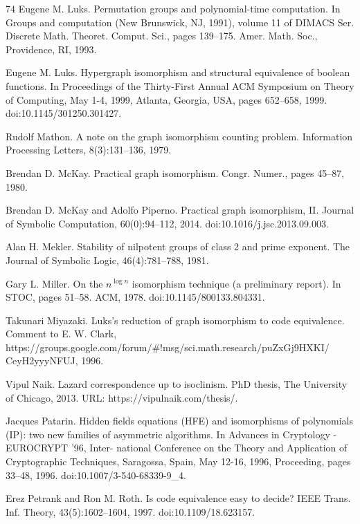 \documentclass[10pt,a4paper]{article}
\begin{document}
\begin{thebibliography}{74}
Eugene M. Luks. Permutation groups and polynomial-time computation. In Groups and computation (New Brunswick, NJ, 1991), volume 11 of DIMACS Ser. Discrete Math. Theoret. Comput. Sci., pages 139–175. Amer. Math. Soc., Providence, RI, 1993.

Eugene M. Luks. Hypergraph isomorphism and structural equivalence of boolean functions. In Proceedings of the Thirty-First Annual ACM Symposium on Theory of Computing, May 1-4, 1999, Atlanta, Georgia, USA, pages 652–658, 1999. doi:10.1145/301250.301427.

Rudolf Mathon. A note on the graph isomorphism counting problem. Information Processing Letters, 8(3):131–136, 1979.

Brendan D. McKay. Practical graph isomorphism. Congr. Numer., pages 45–87, 1980.

Brendan D. McKay and Adolfo Piperno. Practical graph isomorphism, II. Journal of Symbolic Computation, 60(0):94–112, 2014. doi:10.1016/j.jsc.2013.09.003.

Alan H. Mekler. Stability of nilpotent groups of class 2 and prime exponent. The Journal of Symbolic Logic, 46(4):781–788, 1981.

Gary L. Miller. On the $n^{\log n}$ isomorphism technique (a preliminary report). In STOC, pages 51–58. ACM, 1978. doi:10.1145/800133.804331.

Takunari Miyazaki. Luks’s reduction of graph isomorphism to code equivalence. Comment to E. W. Clark, https://groups.google.com/forum/\#!msg/sci.math.research/puZxGj9HXKI/ CeyH2yyyNFUJ, 1996.

Vipul Naik. Lazard correspondence up to isoclinism. PhD thesis, The University of Chicago, 2013. URL: https://vipulnaik.com/thesis/.

Jacques Patarin. Hidden fields equations (HFE) and isomorphisms of polynomials (IP): two new families of asymmetric algorithms. In Advances in Cryptology - EUROCRYPT ’96, Inter- national Conference on the Theory and Application of Cryptographic Techniques, Saragossa, Spain, May 12-16, 1996, Proceeding, pages 33–48, 1996. doi:10.1007/3-540-68339-9\_4.

Erez Petrank and Ron M. Roth. Is code equivalence easy to decide? IEEE Trans. Inf. Theory, 43(5):1602–1604, 1997. doi:10.1109/18.623157.


\end{thebibliography}
\end{document}
